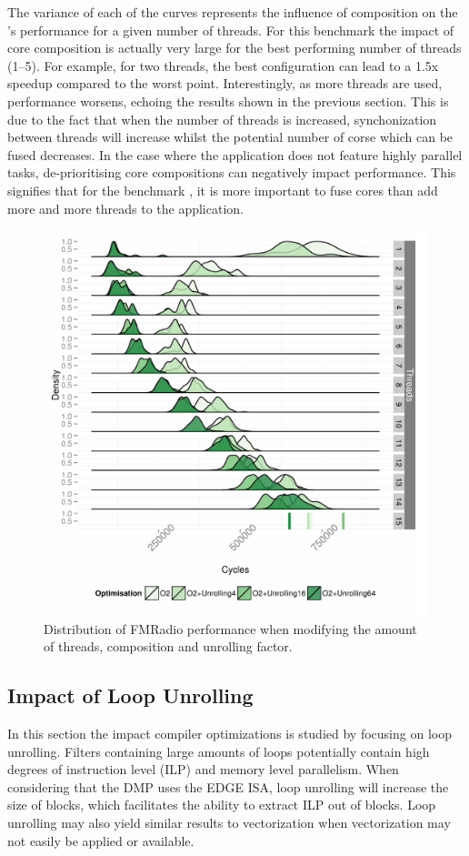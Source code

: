 The variance of each of the curves represents the influence of composition on the 's performance for a given number of threads.
For this benchmark the impact of core composition is actually very large for the best performing number of threads (1--5).
For example, for two threads, the best configuration can lead to a 1.5x speedup compared to the worst point.
Interestingly, as more threads are used, performance worsens, echoing the results shown in the previous section.
This is due to the fact that when the number of threads is increased, synchonization between threads will increase whilst the potential number of corse which can be fused decreases.
In the case where the application does not feature highly parallel tasks, de-prioritising core compositions can negatively impact performance.
This signifies that for the benchmark , it is more important to fuse cores than add more and more threads to the application.


\begin{figure}
  \includegraphics[width=1\textwidth]{streamit-paper/graphics/unrolled_fm.pdf}
  \caption{Distribution of FMRadio performance when modifying the amount of threads, composition and unrolling factor.}\label{fig:fmunroll}
\end{figure}

\subsection{Impact of Loop Unrolling}
In this section the impact compiler optimizations is studied by focusing on loop unrolling.
Filters containing large amounts of loops potentially contain high degrees of instruction level (ILP) and memory level parallelism.
When considering that the DMP uses the EDGE ISA, loop unrolling will increase the size of blocks, which facilitates the ability to extract ILP out of blocks.
Loop unrolling may also yield similar results to vectorization when vectorization may not easily be applied or available.

